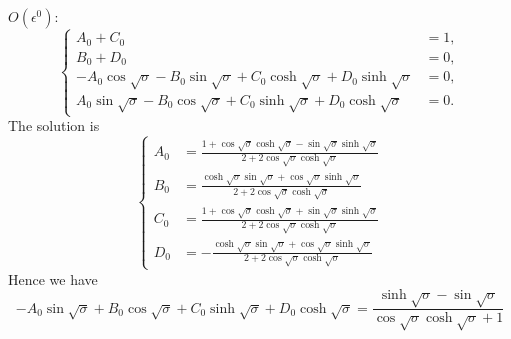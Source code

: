 \documentclass{article}
\begin{document}
\noindent
$O(\epsilon^0)$:
\begin{equation}
    \left\{\begin{aligned}
        A_0 + C_0 &= 1, \\
        B_0 + D_0 &= 0, \\
        - A_0 \cos{\sqrt{\sigma}} - B_0 \sin{\sqrt{\sigma}} + C_0 \cosh{\sqrt{\sigma}} + D_0 \sinh{\sqrt{\sigma}} &= 0, \\
        A_0 \sin{\sqrt{\sigma}} - B_0 \cos{\sqrt{\sigma}} + C_0 \sinh{\sqrt{\sigma}} + D_0 \cosh{\sqrt{\sigma}} &= 0.
    \end{aligned}\right.
\end{equation}
The solution is
\begin{equation}
    \left\{\begin{aligned}
        A_0 &= \frac{1 + \cos\sqrt{\sigma} \cosh\sqrt{\sigma} - \sin\sqrt{\sigma} \sinh\sqrt{\sigma} }{2 + 2 \cos\sqrt{\sigma} \cosh\sqrt{\sigma} } \\
        B_0 &= \frac{\cosh\sqrt{\sigma} \sin\sqrt{\sigma} + \cos\sqrt{\sigma} \sinh\sqrt{\sigma} }{2 + 2 \cos\sqrt{\sigma} \cosh\sqrt{\sigma} } \\
        C_0 &= \frac{1 + \cos\sqrt{\sigma} \cosh\sqrt{\sigma} + \sin\sqrt{\sigma} \sinh\sqrt{\sigma} }{2 + 2 \cos\sqrt{\sigma} \cosh\sqrt{\sigma} } \\
        D_0 &= -\frac{\cosh\sqrt{\sigma} \sin\sqrt{\sigma} + \cos\sqrt{\sigma} \sinh\sqrt{\sigma} }{2 + 2 \cos\sqrt{\sigma} \cosh\sqrt{\sigma} }
    \end{aligned}\right.
\end{equation}
Hence we have
\begin{equation}
    - A_0 \sin{\sqrt{\sigma}} + B_0 \cos{\sqrt{\sigma}} + C_0 \sinh{\sqrt{\sigma}} + D_0 \cosh{\sqrt{\sigma}} = \frac{\sinh\sqrt{\sigma }-\sin\sqrt{\sigma }}{\cos\sqrt{\sigma } \cosh\sqrt{\sigma }+1}
\end{equation}
\end{document}
